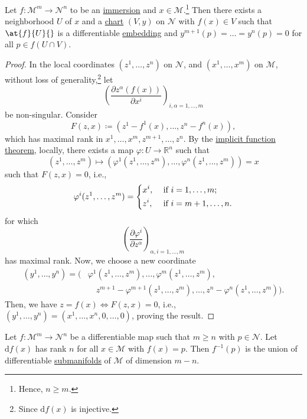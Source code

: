 \begin{lemma}
	Let \(f\colon \mathcal{M}^m \to \mathcal{N}^n \) to be an \hyperref[def:immersion]{immersion} and \(x\in \mathcal{M} \).\footnote{Hence, \(n \geq m\).} Then there exists a neighborhood \(U\) of \(x\) and a \hyperref[def:coordinate-chart]{chart} \((V, y)\) on \(\mathcal{N} \) with \(f(x)\in V\) such that \(\at{f}{U}{}\) is a differentiable \hyperref[def:embedding]{embedding} and \(y^{m+1}(p) = \ldots = y^n(p) = 0\) for all \(p\in f(U \cap V)\).
\end{lemma}
\begin{proof}
	In the local coordinates \((z^1, \ldots , z^n)\) on \(\mathcal{N} \), and \((x^1, \ldots , x^m)\) on \(\mathcal{M} \), without loss of generality,\footnote{Since \(\mathrm{d} f(x)\) is injective.} let
	\[
		\left( \frac{\partial z^\alpha (f(x))}{\partial x^i} \right) _{i, \alpha = 1, \ldots , m}
	\]
	be non-singular. Consider
	\[
		F(z, x) \coloneqq \left( z^1 - f^1(x), \ldots , z^n - f^n(x) \right),
	\]
	which has maximal rank in \(x^1, \ldots , x^m, z^{m+1}, \ldots , z^n\). By the \href{https://en.wikipedia.org/wiki/Implicit_function_theorem#Generalizations}{implicit function theorem}, locally, there exists a map \(\varphi \colon U \to \mathbb{R} ^n\) such that
	\[
		(z^1, \ldots , z^m) \mapsto (\varphi ^1(z^1, \ldots , z^m) , \ldots , \varphi ^n(z^1, \ldots , z^m)) = x
	\]
	such that \(F(z, x) = 0\), i.e.,
	\[
		\varphi ^i(z^1, \ldots , z^m) = \begin{dcases}
			x^i,   & \text{ if } i = 1, \ldots , m ;  \\
			z^{i}, & \text{ if } i = m+1, \ldots , n.
		\end{dcases}
	\]
	for which
	\[
		\left( \frac{\partial \varphi ^i}{\partial z^\alpha }  \right) _{\alpha , i = 1, \ldots , m}
	\]
	has maximal rank. Now, we choose a new coordinate
	\[
		\begin{split}
			(y^1, \ldots , y^n)
			= \big( &\varphi ^1(z^1, \ldots , z^m), \ldots , \varphi ^m (z^1, \ldots , z^m), \\
			&\quad z^{m+1} - \varphi ^{m+1}(z^1, \ldots , z^m), \ldots , z^n - \varphi ^n(z^1, \ldots , z^m) \big).
		\end{split}
	\]
	Then, we have \(z = f(x) \iff F(z, x) = 0\), i.e., \((y^1, \ldots , y^n) = (x^1, \ldots , x^n, 0, \ldots , 0)\), proving the result.
\end{proof}

\begin{lemma}
	Let \(f\colon \mathcal{M}^m \to  \mathcal{N}^n \) be a differentiable map such that \(m \geq n\) with \(p\in \mathcal{N} \). Let \(\mathrm{d} f(x)\) has rank \(n\) for all \(x\in \mathcal{M} \) with \(f(x) = p\). Then \(f^{-1} (p)\) is the union of differentiable \hyperref[def:submanifold]{submanifolds} of \(\mathcal{M} \) of dimension \(m - n\).
\end{lemma}

